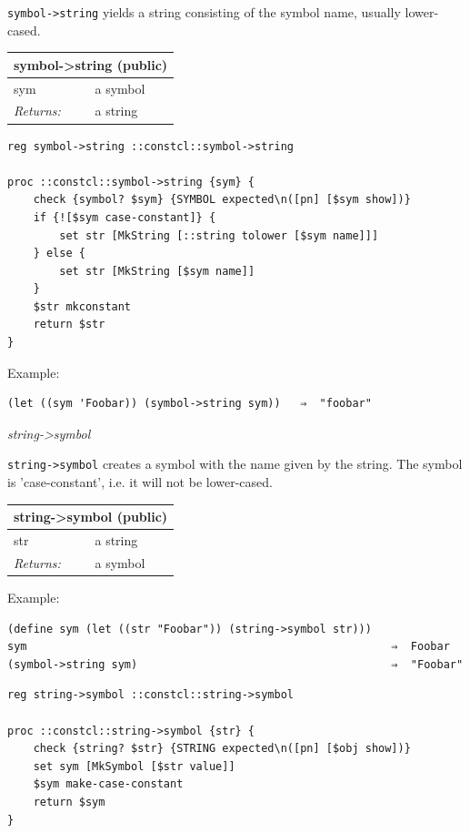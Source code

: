 \documentclass[twoside,9pt]{report}
\begin{document}
\texttt{symbol->string} yields a string consisting of the symbol name, usually lower-cased.

\begin{tabular}{ |l l| }
\hline
\multicolumn{2}{|l|}{symbol->string (public)} \\
\hline
sym & a symbol \\
\textit{Returns:} & a string \\
\hline
\end{tabular}

\noindent\makebox[\linewidth]{\rule{\linewidth}{0.4pt}}
\begin{lstlisting}
reg symbol->string ::constcl::symbol->string
 
proc ::constcl::symbol->string {sym} {
    check {symbol? $sym} {SYMBOL expected\n([pn] [$sym show])}
    if {![$sym case-constant]} {
        set str [MkString [::string tolower [$sym name]]]
    } else {
        set str [MkString [$sym name]]
    }
    $str mkconstant
    return $str
}
\end{lstlisting}
\noindent\makebox[\linewidth]{\rule{\linewidth}{0.4pt}}

Example:

\noindent\makebox[\linewidth]{\rule{\linewidth}{0.4pt}}
\begin{lstlisting}
(let ((sym 'Foobar)) (symbol->string sym))   ⇒  "foobar"
\end{lstlisting}
\noindent\makebox[\linewidth]{\rule{\linewidth}{0.4pt}}

\emph{string->symbol}


\texttt{string->symbol} creates a symbol with the name given by the string. The symbol is 'case-constant', i.e. it will not be lower-cased.

\begin{tabular}{ |l l| }
\hline
\multicolumn{2}{|l|}{string->symbol (public)} \\
\hline
str & a string \\
\textit{Returns:} & a symbol \\
\hline
\end{tabular}


Example:

\noindent\makebox[\linewidth]{\rule{\linewidth}{0.4pt}}
\begin{lstlisting}
(define sym (let ((str "Foobar")) (string->symbol str)))
sym                                                        ⇒  Foobar
(symbol->string sym)                                       ⇒  "Foobar"
\end{lstlisting}
\noindent\makebox[\linewidth]{\rule{\linewidth}{0.4pt}}
\noindent\makebox[\linewidth]{\rule{\linewidth}{0.4pt}}
\begin{lstlisting}
reg string->symbol ::constcl::string->symbol
 
proc ::constcl::string->symbol {str} {
    check {string? $str} {STRING expected\n([pn] [$obj show])}
    set sym [MkSymbol [$str value]]
    $sym make-case-constant
    return $sym
}
\end{lstlisting}
\noindent\makebox[\linewidth]{\rule{\linewidth}{0.4pt}}
\end{document}
